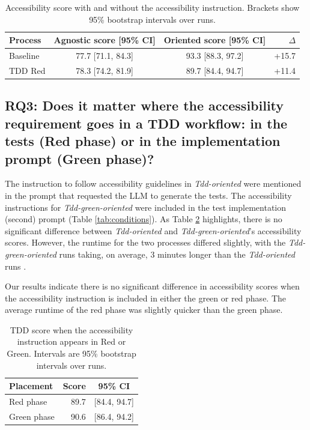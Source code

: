 \documentclass[conference]{IEEEtran}
\begin{document}
\begin{table}[H]
  \centering
  \caption{Accessibility score with and without the accessibility instruction. Brackets show 95\% bootstrap intervals over runs.}
  \label{tab:rq2-instruction}
  \scriptsize
  \begin{tabularx}{\columnwidth}{X c c r}
    \hline
    \textbf{Process} & \textbf{Agnostic score [95\% CI]} & \textbf{Oriented score [95\% CI]} & \textbf{$\Delta$} \\
    \hline
    Baseline & 77.7 [71.1, 84.3] & 93.3 [88.3, 97.2] & +15.7 \\
    TDD Red & 78.3 [74.2, 81.9] & 89.7 [84.4, 94.7] & +11.4 \\
    \hline
  \end{tabularx}
\end{table}
\FloatBarrier

\subsection{RQ3: Does it matter where the accessibility requirement goes in a TDD workflow: in the tests (Red phase) or in the implementation prompt (Green phase)?}
The instruction to follow accessibility guidelines in \textit{Tdd-oriented} were mentioned in the prompt that requested the LLM to 
generate the tests. The accessibility instructions for \textit{Tdd-green-oriented} were included in the test implementation (second) 
prompt (Table \ref{tab:conditions}). As Table \ref{tab:rq3-placement} highlights, there is no significant difference between \textit{Tdd-oriented}
and \textit{Tdd-green-oriented}'s accessibility scores. However, the runtime for the two processes differed slightly, with the \textit{Tdd-green-oriented} 
runs taking, on average, 3 minutes longer than the \textit{Tdd-oriented} runs \cite{2026dashboard}. 

Our results indicate there is no significant difference in accessibility scores when the accessibility instruction is 
included in either the green or red phase. The average runtime of the red phase was slightly quicker than the green phase.
\begin{table}[H]
  \centering
  \caption{TDD score when the accessibility instruction appears in Red or Green. Intervals are 95\% bootstrap intervals over runs.}
  \label{tab:rq3-placement}
  \begin{tabularx}{\columnwidth}{X r c}
    \hline
    \textbf{Placement} & \textbf{Score} & \textbf{95\% CI} \\
    \hline
    Red phase & 89.7 & [84.4, 94.7] \\
    Green phase & 90.6 & [86.4, 94.2] \\
    \hline
  \end{tabularx}
\end{table}
\FloatBarrier
\end{document}
